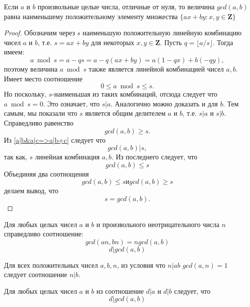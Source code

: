 \begin{Thr}
Если $a$ и $b$ произвольные целые числа, отличные от нуля, то величина $gcd(a,b)$ равна наименьшему положительному элементу множества $\{ax+by:x,y \in \textbf{Z}\}$
\end{Thr}
\begin{proof}
Обозначим через $s$ наименьшую положительную линейную комбинацию чисел $a$ и $b$, т.е. $s=ax+by$ для некоторых $x,y \in \textbf{Z}$.
Пусть $q=\lfloor a /s \rfloor$. Тогда имеем:
$$
a \bmod s = a - qs = a - q(ax + by) = a(1 - qx) + b(-qy),
$$
поэтому величина  $a \bmod s$ также является линейной комбинацией чисел $a,b$.  Имеет место соотношение $$ 0 \leq a \bmod s \leq s.$$
Но поскольку, $s$-наименьшая из таких комбинаций, отсюда следует что $a \bmod s = 0$. Это означает, что $s | a$. Аналогично можно доказать и для $b$. Тем самым, мы показали что $s$ является общим делителем $a$ и $b$, т.е. $s | a$ и $s | b$. Справедливо равенство $$ gcd(a,b) \geq s.$$ 
Из \eqref{a|b&a|c=>a|b+c} следует что $$gcd(a,b) | s,$$
так как, $s$ линейная комбинация $a,b$. Из последнего следует, что $$gcd (a,b) \leq s$$
Объединяя два соотнощения 
$$ 
gcd (a,b) \leq s \textit{и}  gcd(a,b) \geq s
$$
делаем вывод, что $$s= gcd(a,b).$$
\end{proof}
\begin{Cons}
Для любых целых чисел $a$ и $b$  и произвольного неотрицательного числа $n$ справедливо соотношение:
$$ gcd(an,bn)=n gcd(a,b)$$
$$ d | gcd(a,b)$$ 
\end{Cons}

\begin{Cons}
Для всех положительных чисел $a,b,n$, из условия что $n|ab$ $gcd(a,n)=1$ следует соотношение $n|b.$ 
\end{Cons}
\begin{Cons}
Для любых целых чисел $a$ и $b$ из соотношение $d|a$ и $d|b$ следует, что 
$$ d | gcd(a,b)$$ 
\end{Cons}

